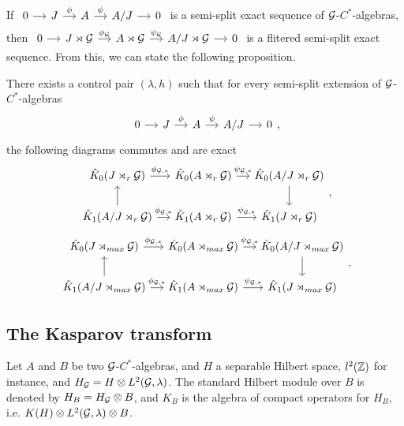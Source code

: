 If $\begin{tikzcd}[column sep = small]
0 \arrow{r} & J\arrow{r}{\phi}& A \arrow{r}{\psi} & A/J \arrow{r} & 0
\end{tikzcd}$ is a semi-split exact sequence of $\mathcal G$-$C^*$-algebras, then 
$\begin{tikzcd}[column sep = small]
0 \arrow{r} & J\rtimes \G\arrow{r}{\phi_\G}& A\rtimes \G \arrow{r}{\psi_\G} & A/J\rtimes \G \arrow{r} & 0
\end{tikzcd}$ is a flitered semi-split exact sequence. From this, we can state the following proposition.\\

\begin{prop}
There exists a control pair $(\lambda,h)$ such that for every semi-split extension of $\mathcal G$-$C^*$-algebras
\[\begin{tikzcd}[column sep = small]
0 \arrow{r} & J\arrow{r}{\phi}& A \arrow{r}{\psi} & A/J \arrow{r} & 0
\end{tikzcd},\]
the following diagrams commutes and are exact 
\[\begin{tikzcd}[column sep = small]
\hat K_0(J\rtimes_r \G) \arrow{r}{\phi_{\G,*}}&\hat K_0( A\rtimes_r \G ) \arrow{r}{\psi_{\G,*}} & \hat K_0( A/J\rtimes_r \G) \arrow{d} \\
\hat K_1(A/J\rtimes_r \G) \arrow{u} \arrow{r}{\phi_{\G,*}}& \hat K_1( A\rtimes_r \G ) \arrow{r}{\psi_{\G,*}} & \hat K_1( J\rtimes_r \G)
\end{tikzcd},\]
\[\begin{tikzcd}[column sep = small]
\hat K_0(J\rtimes_{max} \G) \arrow{r}{\phi_{\G,*}}&\hat K_0( A\rtimes_{max} \G ) \arrow{r}{\psi_{\G,*}} & \hat K_0( A/J\rtimes_{max} \G) \arrow{d} \\
\hat K_1(A/J\rtimes_{max} \G) \arrow{u} \arrow{r}{\phi_{\G,*}}& \hat K_1( A\rtimes_{max} \G ) \arrow{r}{\psi_{\G,*}} & \hat K_1( J\rtimes_{max} \G)
\end{tikzcd}.\]
\end{prop}

\subsection{The Kasparov transform}

Let $A$ and $B$ be two $\mathcal G$-$C^*$-algebras, and $H$ a separable Hilbert space, $l^2(\mathbb Z)$ for instance, and $H_\mathcal G= H\otimes L^2(\mathcal G,\lambda)$. The standard Hilbert module over $B$ is denoted by $H_B=H_\mathcal G\otimes B$, and $K_B$ is the algebra of compact operators for $H_B$, i.e. $K(H)\otimes L^2(\mathcal G,\lambda)\otimes B$. \\

